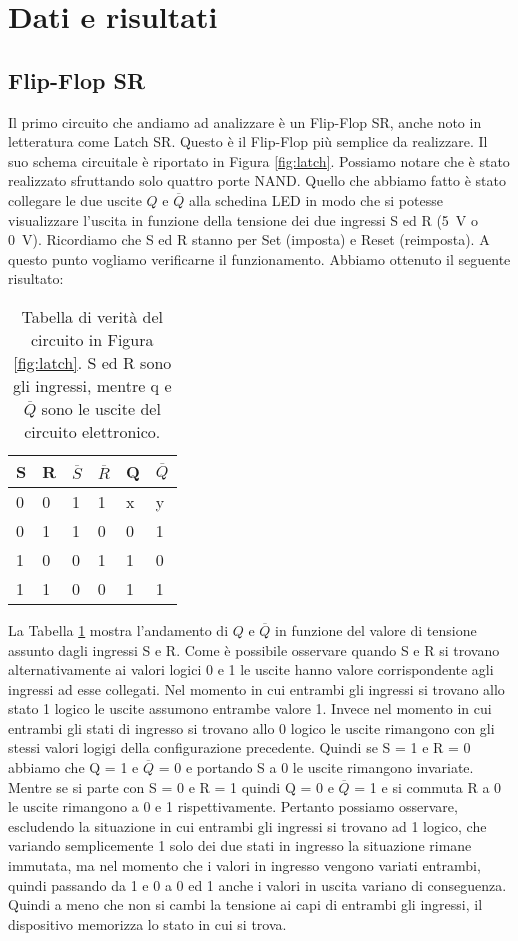 \section*{Dati e risultati}

\subsection*{Flip-Flop SR}

Il primo circuito che andiamo ad analizzare è un Flip-Flop SR, anche noto in letteratura come Latch SR. Questo è il Flip-Flop più semplice da realizzare.
Il suo schema circuitale è riportato in Figura \ref{fig:latch}. Possiamo notare che è stato realizzato sfruttando solo quattro porte NAND.
Quello che abbiamo fatto è stato collegare le due uscite $Q$ e $\overline{Q}$ alla schedina LED in modo che si potesse visualizzare l'uscita in funzione della tensione dei due ingressi S ed R (\SI{+5}{\volt} o \SI{0}{\volt}). Ricordiamo che S ed R stanno per Set (imposta) e Reset (reimposta).
A questo punto vogliamo verificarne il funzionamento. Abbiamo ottenuto il seguente risultato:

\begin{table}[h]
    \centering
    \begin{tabular}{llll|ll}
	\toprule
		S & R & $\overline{S}$ & $\overline{R}$ & Q & $\overline{Q}$ \\
	\midrule
		0 & 0 & 1 & 1 & x & y \\
		0 & 1 & 1 & 0 & 0 & 1 \\
		1 & 0 & 0 & 1 & 1 & 0 \\
		1 & 1 & 0 & 0 & 1 & 1 \\
	\bottomrule
	\end{tabular}
    \caption{Tabella di verità del circuito in Figura \ref{fig:latch}. S ed R sono gli ingressi, mentre q e $\overline{Q}$ sono le uscite del circuito elettronico.}
    \label{tab:latch}
\end{table}

La Tabella \ref{tab:latch} mostra l'andamento di $Q$ e $\overline{Q}$ in funzione del valore di tensione assunto dagli ingressi S e R. Come è possibile osservare quando S e R si trovano alternativamente ai valori logici 0 e 1 le uscite hanno valore corrispondente agli ingressi ad esse collegati.
Nel momento in cui entrambi gli ingressi si trovano allo stato 1 logico le uscite assumono entrambe valore 1. Invece nel momento in cui entrambi gli stati di ingresso si trovano allo 0 logico le uscite rimangono con gli stessi valori logigi della configurazione precedente.
Quindi se S = 1 e R = 0 abbiamo che Q = 1 e $\overline{Q}$ = 0 e portando S a 0 le uscite rimangono invariate. Mentre se si parte con S = 0 e R = 1 quindi Q = 0 e $\overline{Q}$ = 1 e si commuta R a 0 le uscite rimangono a 0 e 1 rispettivamente. Pertanto possiamo osservare, escludendo la situazione in cui entrambi gli ingressi si trovano ad 1 logico, che variando semplicemente 1 solo dei due stati in ingresso la situazione rimane immutata, ma nel momento che i valori in ingresso vengono variati entrambi, quindi passando da 1 e 0 a 0 ed 1 anche i valori in uscita variano di conseguenza. Quindi a meno che non si cambi la tensione ai capi di entrambi gli ingressi, il dispositivo memorizza lo stato in cui si trova.

